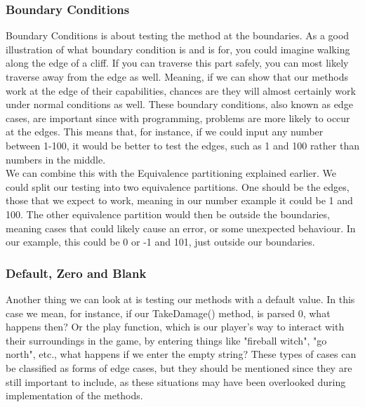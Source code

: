 \subsubsection{Boundary Conditions}
Boundary Conditions is about testing the method at the boundaries. As a good illustration of what boundary condition is and is for, you could imagine walking along the edge of a cliff. If you can traverse this part safely, you can most likely traverse away from the edge as well. Meaning, if we can show that our methods work at the edge of their capabilities, chances are they will almost certainly work under normal conditions as well. These boundary conditions, also known as edge cases, are important since with programming, problems are more likely to occur at the edges\cite{TestingBlackbox}. This means that, for instance, if we could input any number between 1-100, it would be better to test the edges, such as 1 and 100 rather than numbers in the middle. \\
We can combine this with the Equivalence partitioning explained earlier. We could split our testing into two equivalence partitions. One should be the edges, those that we expect to work, meaning in our number example it could be 1 and 100. The other equivalence partition would then be outside the boundaries, meaning cases that could likely cause an error, or some unexpected behaviour. In our example, this could be 0 or -1 and 101, just outside our boundaries. 
\subsubsection{Default, Zero and Blank}
Another thing we can look at is testing our methods with a default value. In this case we mean, for instance, if our TakeDamage() method, is parsed 0, what happens then? Or the play function, which is our player's way to interact with their surroundings in the game, by entering things like "fireball witch", "go north", etc., what happens if we enter the empty string? These types of cases can be classified as forms of edge cases, but they should be mentioned since they are still important to include, as these situations may have been overlooked during implementation of the methods\cite{TestingBlackbox}.
